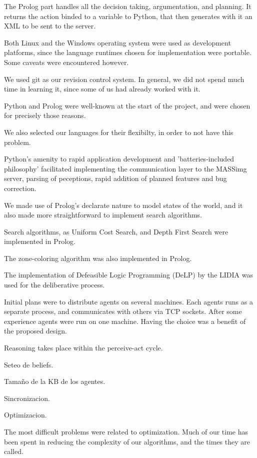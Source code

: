 \documentclass{llncs2e/llncs}
\begin{document}
    The Prolog part handles all the decision taking, argumentation, and planning. 
    It returns the action binded to a variable to Python, that then generates with 
    it an XML to be sent to the server.

    Both Linux and the Windows operating system were used as development 
    platforms, since the language runtimes chosen for implementation were 
    portable. Some caveats were encountered however.

    We used git as our revision control system. In general, we did not spend much 
    time in learning it, since some of us had already worked with it.

    Python and Prolog were well-known at the start of the project, and were chosen 
    for precisely those reasons.

    We also selected our languages for their flexibilty, in order to not have this 
    problem.

    Python's amenity to rapid application development and 'batteries-included 
    philosophy' facilitated implementing the communication layer to the MASSimg 
    server, parsing of peceptions, rapid addition of planned features and bug 
    correction.

    We made use of Prolog's declarate nature to model states of the world, and it 
    also made more straightforward to implement search algorithms.

    Search algorithms, as Uniform Cost Search, and Depth First Search were 
    implemented in Prolog.

    The zone-coloring algorithm was also implemented in Prolog.

    The implementation of Defeasible Logic Programming (DeLP) by the LIDIA was 
    used for the deliberative process.

    Initial plans were to distribute agents on several machines. Each agents runs 
    as a separate process, and communicates with others via TCP sockets. After 
    some experience agents were run on one machine. Having the choice was a 
    benefit of the proposed design.

    Reasoning takes place within the perceive-act cycle.

    Seteo de beliefs.

    Tamaño de la KB de los agentes.

    Sincronizacion.

    Optimizacion.

    The most difficult problems were related to optimization. Much of our time has 
    been spent in reducing the complexity of our algorithms, and the times they 
    are called.
\end{document}
